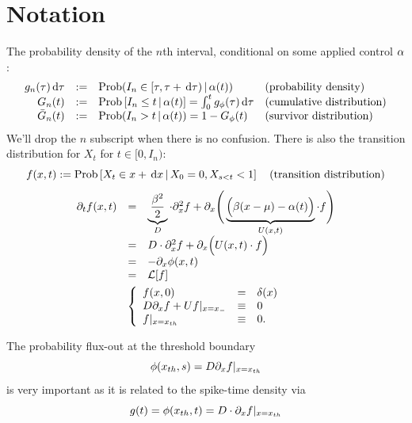 \documentclass{article}
\begin{document}
\section{Notation}
The probability density of the $n$th interval,
conditional on some applied control ${\alpha}$:
\begin{equation} 
\begin{array}{rcll} 
g_n({\tau}) \, \mathrm{d} {\tau} &:=& \operatorname{Prob}(I_{n} \in [{\tau}, {\tau} + \, \mathrm{d} {\tau})  \,|\,
 {\alpha}(t)) &
 \textrm{(probability density)} 
\\ 
G_{n}(t) &:=& \operatorname{Prob} \left[I_{n} \leq t  \,|\,
 {\alpha}(t) \right] = \int_0^t g_{\phi}({\tau}) \, \mathrm{d} {\tau} &
 \textrm{(cumulative distribution)}
\\
{ \bar{G} }_{n}(t) &:= & \operatorname{Prob}(I_{n}>t \,|\, {\alpha}(t) ) = 1 - G_{\phi}(t)
&
 \textrm{(survivor distribution)}
\end{array}
\label{eq:ISI_distribution_functions}
\end{equation}
We'll drop the $n$ subscript when there is no confusion. 
There is also the transition distribution for $X_t$ for $t \in [0,
I_{n})$:
\begin{equation}
f(x,t) := \operatorname{Prob} \left[X_{t} \in x+ \, \mathrm{d} x  \,|\,
 X_0 = 0, X_{s < t} < 1  \right]  \quad
 \textrm{(transition distribution)}
 \label{eq:transition_distribution}
\end{equation} 
\begin{equation}
\begin{gathered}
\begin{array}{lcl}
	{\partial}_t f (x,t) &=&
					\underbrace{\frac{{\beta}^2 }{2}}_{D}\cdot {\partial}^2_x f 
					+ {\partial}_x \Bigg(  
					\underbrace{\Big( {\beta} (x-{\mu }) - {\alpha}(t) \Big)}_{U(x,t)}  \cdot  f \Bigg)
					\\
					&=&
					D \cdot {\partial}^2_x f +
					{\partial}_x  \Big( U(x,t) \cdot f \Big)
					\\
					&=&
					- {\partial}_x \phi(x,t)
					\\
					&=&
					{ \mathcal{L} }[f] 
					\end{array}
	\\
	\left\{ \begin{array}{lcl}
	 f (x,0) &=& \delta(x)
	\\
	D {\partial}_xf + U f |_{x={ x_{-} }} &\equiv& 0 
	\\
	f |_{x={ x_{th} }} &\equiv& 0.
	\end{array} \right.
\label{eq:FP_pde_OU_absorbBC_CDF}
\end{gathered}
\end{equation}

The probability flux-out at the threshold boundary $$\phi({ x_{th} }, s) = D
{\partial}_xf |_{x={ x_{th} }}$$ is very important as it is related to the spike-time density
via $$g( t)  = \phi({ x_{th} }, t) = D\cdot {\partial}_x f|_{x={ x_{th} }}$$
 
\end{document}
